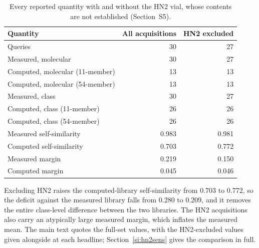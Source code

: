 \begin{table}[htbp]
\centering
\caption{Every reported quantity with and without the HN2 vial, whose contents are not established (Section~S5).}
\label{tab:si-hn2}
\small
\begin{tabular}{lrr}
\toprule
Quantity & All acquisitions & HN2 excluded \\
\midrule
Queries & 30 & 27 \\
Measured, molecular & 30 & 27 \\
Computed, molecular (11-member) & 13 & 13 \\
Computed, molecular (54-member) & 13 & 13 \\
Measured, class & 30 & 27 \\
Computed, class (11-member) & 26 & 26 \\
Computed, class (54-member) & 26 & 26 \\
Measured self-similarity & 0.983 & 0.981 \\
Computed self-similarity & 0.703 & 0.772 \\
Measured margin & 0.219 & 0.150 \\
Computed margin & 0.045 & 0.046 \\
\bottomrule
\end{tabular}

\begin{flushleft}\footnotesize Excluding HN2 raises the computed-library self-similarity from 0.703 to 0.772, so the deficit against the measured library falls from 0.280 to 0.209, and it removes the entire class-level difference between the two libraries. The HN2 acquisitions also carry an atypically large measured margin, which inflates the measured mean. The main text quotes the full-set values, with the HN2-excluded values given alongside at each headline; Section~\ref{si:hn2sens} gives the comparison in full.\end{flushleft}
\end{table}
